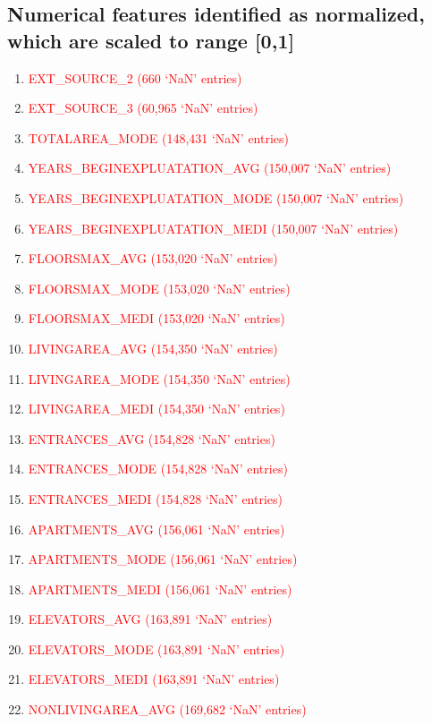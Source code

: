 \documentclass[12pt, letterpaper]{article}
\begin{document}
\begin{appendices}
\subsection{Numerical features identified as normalized, which are scaled to range [0,1]}
\label{numericalfeatnormalizedunitrange}
\footnotesize
\begin{enumerate}
 \item \textcolor{red}{EXT_SOURCE_2 (660 `NaN' entries)}
 \item \textcolor{red}{EXT_SOURCE_3 (60,965 `NaN' entries)}
 \item \textcolor{red}{TOTALAREA_MODE (148,431 `NaN' entries)}
 \item \textcolor{red}{YEARS_BEGINEXPLUATATION_AVG (150,007 `NaN' entries)}
 \item \textcolor{red}{YEARS_BEGINEXPLUATATION_MODE (150,007 `NaN' entries)}
 \item \textcolor{red}{YEARS_BEGINEXPLUATATION_MEDI (150,007 `NaN' entries)}
 \item \textcolor{red}{FLOORSMAX_AVG (153,020 `NaN' entries)}
 \item \textcolor{red}{FLOORSMAX_MODE (153,020 `NaN' entries)}
 \item \textcolor{red}{FLOORSMAX_MEDI (153,020 `NaN' entries)}
 \item \textcolor{red}{LIVINGAREA_AVG (154,350 `NaN' entries)}
 \item \textcolor{red}{LIVINGAREA_MODE (154,350 `NaN' entries)}
 \item \textcolor{red}{LIVINGAREA_MEDI (154,350 `NaN' entries)}
 \item \textcolor{red}{ENTRANCES_AVG (154,828 `NaN' entries)}
 \item \textcolor{red}{ENTRANCES_MODE (154,828 `NaN' entries)}
 \item \textcolor{red}{ENTRANCES_MEDI (154,828 `NaN' entries)}
 \item \textcolor{red}{APARTMENTS_AVG (156,061 `NaN' entries)}
 \item \textcolor{red}{APARTMENTS_MODE (156,061 `NaN' entries)}
 \item \textcolor{red}{APARTMENTS_MEDI (156,061 `NaN' entries)}
 \item \textcolor{red}{ELEVATORS_AVG (163,891 `NaN' entries)}
 \item \textcolor{red}{ELEVATORS_MODE (163,891 `NaN' entries)}
 \item \textcolor{red}{ELEVATORS_MEDI (163,891 `NaN' entries)}
 \item \textcolor{red}{NONLIVINGAREA_AVG (169,682 `NaN' entries)}

\end{enumerate}
\end{appendices}
\end{document}
